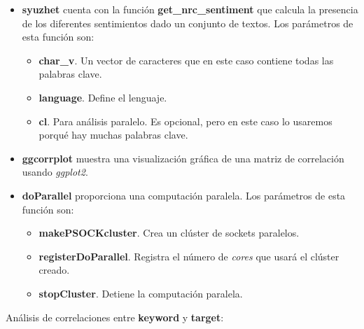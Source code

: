 \documentclass[
]{article}
\providecommand{\tightlist}{%
  \setlength{\itemsep}{0pt}\setlength{\parskip}{0pt}}
\begin{document}
\begin{itemize}
\tightlist
\item
  \textbf{syuzhet} cuenta con la función \textbf{get\_nrc\_sentiment}
  que calcula la presencia de los diferentes sentimientos dado un
  conjunto de textos. Los parámetros de esta función son:

  \begin{itemize}
  \tightlist
  \item
    \textbf{char\_v}. Un vector de caracteres que en este caso contiene
    todas las palabras clave.
  \item
    \textbf{language}. Define el lenguaje.
  \item
    \textbf{cl}. Para análisis paralelo. Es opcional, pero en este caso
    lo usaremos porqué hay muchas palabras clave.
  \end{itemize}
\item
  \textbf{ggcorrplot} muestra una visualización gráfica de una matriz de
  correlación usando \emph{ggplot2}.
\item
  \textbf{doParallel} proporciona una computación paralela. Los
  parámetros de esta función son:

  \begin{itemize}
  \tightlist
  \item
    \textbf{makePSOCKcluster}. Crea un clúster de sockets paralelos.
  \item
    \textbf{registerDoParallel}. Registra el número de \emph{cores} que
    usará el clúster creado.
  \item
    \textbf{stopCluster}. Detiene la computación paralela.
  \end{itemize}
\end{itemize}

Análisis de correlaciones entre \textbf{keyword} y \textbf{target}:
\end{document}
